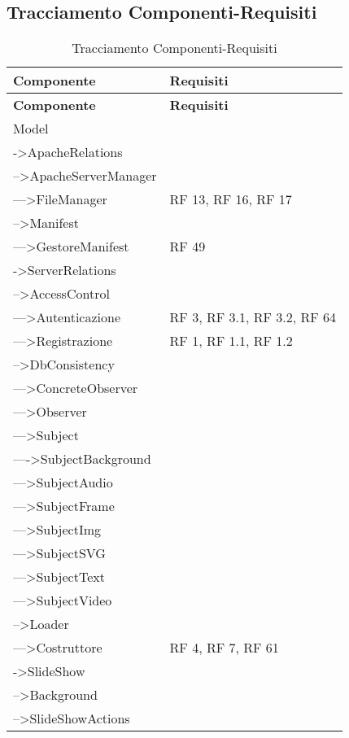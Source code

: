 \subsection{Tracciamento Componenti-Requisiti}{ 
\renewcommand*{\arraystretch}{1.4} 
\begin{longtable} [c]{| p{8cm} | p{5cm} |} 
\caption{Tracciamento Componenti-Requisiti \label{tab:traccCompReq}}\\ \hline\textbf{Componente} & \textbf{Requisiti} \\ 
\hline \endfirsthead \hline 
\textbf{Componente} & \textbf{Requisiti} \\ 
\hline \endhead \hline \endfoot \hline \endlastfoot 
Model & \\ 
 \hline 
->ApacheRelations & \\ 
 \hline 
-->ApacheServerManager & \\ 
 \hline 
--->FileManager & RF 13, RF 16, RF 17\\ 
 \hline 
-->Manifest & \\ 
 \hline 
--->GestoreManifest & RF 49\\ 
 \hline 
->ServerRelations & \\ 
 \hline 
-->AccessControl & \\ 
 \hline 
--->Autenticazione & RF 3, RF 3.1, RF 3.2, RF 64\\ 
 \hline 
--->Registrazione & RF 1, RF 1.1, RF 1.2\\ 
 \hline 
-->DbConsistency & \\ 
 \hline 
--->ConcreteObserver & \\ 
 \hline 
--->Observer & \\ 
 \hline 
--->Subject & \\ 
 \hline 
---->SubjectBackground & \\ 
 \hline 
--->SubjectAudio & \\ 
 \hline 
--->SubjectFrame & \\ 
 \hline 
--->SubjectImg & \\ 
 \hline 
--->SubjectSVG & \\ 
 \hline 
--->SubjectText & \\ 
 \hline 
--->SubjectVideo & \\ 
 \hline 
-->Loader & \\ 
 \hline 
--->Costruttore & RF 4, RF 7, RF 61\\ 
 \hline 
->SlideShow & \\ 
 \hline 
-->Background & \\ 
 \hline 
-->SlideShowActions & \\ 

\end{longtable}}
